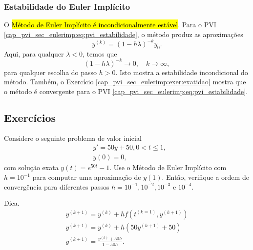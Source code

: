 \subsubsection{Estabilidade do Euler Implícito}

O \hl{Método de Euler Implícito é incondicionalmente estável}. Para o PVI \eqref{cap_pvi_sec_eulerimp:eq:pvi_estabilidade}, o método produz as aproximações
\begin{equation}
  y^{(k)} = \left(1 - h\lambda\right)^{-k}y_0.
\end{equation}
Aqui, para qualquer $\lambda<0$, temos que
\begin{equation}
  \left(1 - h\lambda\right)^{-k} \to 0,\quad k\to\infty,
\end{equation}
para qualquer escolha do passo $h>0$. Isto mostra a estabilidade incondicional do método. Também, o Exercício \ref{cap_pvi_sec_eulerimp:exer:exatidao} mostra que o método é convergente para o PVI \eqref{cap_pvi_sec_eulerimp:eq:pvi_estabilidade}.

\subsection{Exercícios}

\begin{exer}
  Considere o seguinte problema de valor inicial
  \begin{subequations}
    \begin{align}
      &y' = 50y + 50, 0 < t \leq 1,\\
      &y(0) = 0,
    \end{align}
  \end{subequations}
  com solução exata $y(t) = e^{50t} - 1$. Use o Método de Euler Implícito com $h = 10^{-1}$ para computar uma aproximação de $y(1)$. Então, verifique a ordem de convergência para diferentes passos $h = 10^{-1}, 10^{-2}, 10^{-3}$ e $10^{-4}$.
\end{exer}
\begin{resp}
  Dica.
  \begin{gather}
    y^{(k+1)} = y^{(k)} + hf\left(t^{(k=1)}, y^{(k+1)}\right)\\
    y^{(k+1)} = y^{(k)} + h \left(50y^{(k+1)} + 50\right)\\
    y^{(k+1)} = \frac{y^{(k)} + 50h}{1 - 50h}.
  \end{gather}
\end{resp}

